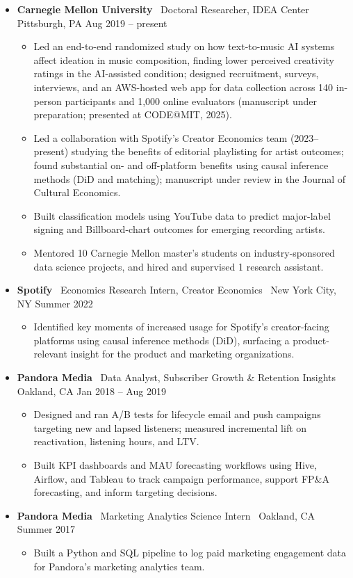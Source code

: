 \documentclass[10pt,letterpaper]{article}
\newcommand{\sep}{{\color{gray}\,\textbullet\,\,}}
\begin{document}
\begin{itemize}[leftmargin=0pt, label={}, itemsep=4pt]
\item \textbf{Carnegie Mellon University} \sep Doctoral Researcher, IDEA Center \sep Pittsburgh, PA \hfill Aug 2019 -- present
  \begin{itemize}
  \item Led an end-to-end randomized study on how text-to-music AI systems affect ideation in music composition, finding lower perceived creativity ratings in the AI-assisted condition; designed recruitment, surveys, interviews, and an AWS-hosted web app for data collection across 140 in-person participants and 1{,}000 online evaluators (manuscript under preparation; presented at CODE@MIT, 2025).
  \item Led a collaboration with Spotify's Creator Economics team (2023--present) studying the benefits of editorial playlisting for artist outcomes; found substantial on- and off-platform benefits using causal inference methods (DiD and matching); manuscript under review in the Journal of Cultural Economics.
  \item Built classification models using YouTube data to predict major-label signing and Billboard-chart outcomes for emerging recording artists.
  \item Mentored 10 Carnegie Mellon master's students on industry-sponsored data science projects, and hired and supervised 1 research assistant.
  \end{itemize}
\item \textbf{Spotify} \sep Economics Research Intern, Creator Economics \sep New York City, NY \hfill Summer 2022
  \begin{itemize}
  \item Identified key moments of increased usage for Spotify's creator-facing platforms using causal inference methods (DiD), surfacing a product-relevant insight for the product and marketing organizations.
  \end{itemize}
\item \textbf{Pandora Media} \sep Data Analyst, Subscriber Growth \& Retention Insights \sep Oakland, CA \hfill Jan 2018 -- Aug 2019
  \begin{itemize}
  \item Designed and ran A/B tests for lifecycle email and push campaigns targeting new and lapsed listeners; measured incremental lift on reactivation, listening hours, and LTV.
  \item Built KPI dashboards and MAU forecasting workflows using Hive, Airflow, and Tableau to track campaign performance, support FP\&A forecasting, and inform targeting decisions.
  \end{itemize}
\item \textbf{Pandora Media} \sep Marketing Analytics Science Intern \sep Oakland, CA \hfill Summer 2017
  \begin{itemize}
  \item Built a Python and SQL pipeline to log paid marketing engagement data for Pandora's marketing analytics team.
  \end{itemize}
\end{itemize}
\end{document}
